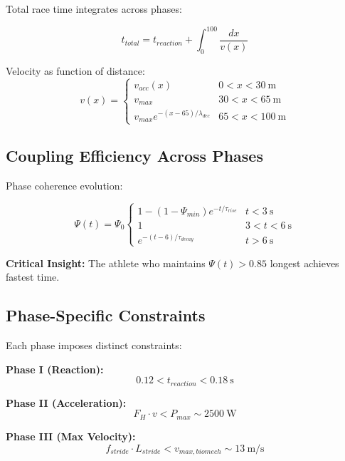 Total race time integrates across phases:

\begin{equation}
t_{total} = t_{reaction} + \int_0^{100} \frac{dx}{v(x)}
\label{eq:total_time}
\end{equation}

Velocity as function of distance:
\begin{equation}
v(x) = \begin{cases}
v_{acc}(x) & 0 < x < 30~\text{m} \\
v_{max} & 30 < x < 65~\text{m} \\
v_{max} e^{-(x-65)/\lambda_{dec}} & 65 < x < 100~\text{m}
\end{cases}
\label{eq:velocity_profile}
\end{equation}

\subsection{Coupling Efficiency Across Phases}

Phase coherence evolution:

\begin{equation}
\Psi(t) = \Psi_0 \begin{cases}
1 - (1-\Psi_{min})e^{-t/\tau_{rise}} & t < 3~\text{s} \\
1 & 3 < t < 6~\text{s} \\
e^{-(t-6)/\tau_{decay}} & t > 6~\text{s}
\end{cases}
\label{eq:phase_coherence_evolution}
\end{equation}

\textbf{Critical Insight:} The athlete who maintains $\Psi(t) > 0.85$ longest achieves fastest time.

\subsection{Phase-Specific Constraints}

Each phase imposes distinct constraints:

\textbf{Phase I (Reaction):}
\begin{equation}
0.12 < t_{reaction} < 0.18~\text{s}
\end{equation}

\textbf{Phase II (Acceleration):}
\begin{equation}
F_H \cdot v < P_{max} \sim 2500~\text{W}
\end{equation}

\textbf{Phase III (Max Velocity):}
\begin{equation}
f_{stride} \cdot L_{stride} < v_{max,biomech} \sim 13~\text{m/s}
\end{equation}

